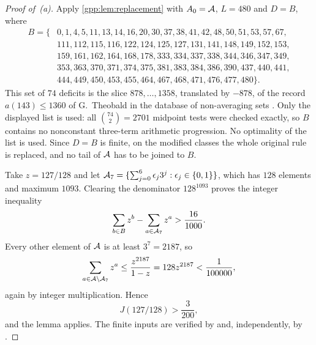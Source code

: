 \begin{proof}[Proof of~\textup{(a)}]
Apply \cref{gpp:lem:replacement} with $A_0=\mathcal{A}$, $L=480$ and $D=B$, where
\[
\begin{split}
B=\{&
0,1,4,5,11,13,14,16,20,30,37,38,41,42,48,50,51,53,57,67,\\
&111,112,115,116,122,124,125,127,131,141,148,149,152,153,\\
&159,161,162,164,168,178,333,334,337,338,344,346,347,349,\\
&353,363,370,371,374,375,381,383,384,386,390,437,440,441,\\
&444,449,450,453,455,464,467,468,471,476,477,480\}.
\end{split}
\]
This set of $74$ deficits is the slice $878,\ldots,1358$, translated by $-878$, of the
record $a(143)\le1360$ of G.~Theobald in the database of non-averaging sets
\cite{WroblewskiNonaveraging}. Only the displayed list is used: all $\binom{74}{2}=2701$
midpoint tests were checked exactly, so $B$ contains no nonconstant three-term arithmetic
progression. No optimality of the list is used. Since $D=B$ is finite, on the modified
classes the whole original rule is replaced, and no tail of $\mathcal{A}$ has to be joined to
$B$.

Take $z=127/128$ and let
$\mathcal{A}_7=\{\sum_{j=0}^{6}\epsilon_j3^j:\epsilon_j\in\{0,1\}\}$, which has $128$
elements and maximum $1093$. Clearing the denominator $128^{1093}$ proves the integer
inequality
\[
 \sum_{b\in B}z^b-\sum_{a\in\mathcal{A}_7}z^a>\frac{16}{1000}.
\]
Every other element of $\mathcal{A}$ is at least $3^7=2187$, so
\[
 \sum_{a\in\mathcal{A}\setminus\mathcal{A}_7}z^a\le\frac{z^{2187}}{1-z}=128z^{2187}<\frac1{100000},
\]
again by integer multiplication. Hence
\begin{equation}\label{gpp:eq:Jpositive}
 J(127/128)>\frac{3}{200},
\end{equation}
and the lemma applies. \gppsloppy The finite inputs are verified by
 and, independently, by
.
\end{proof}

